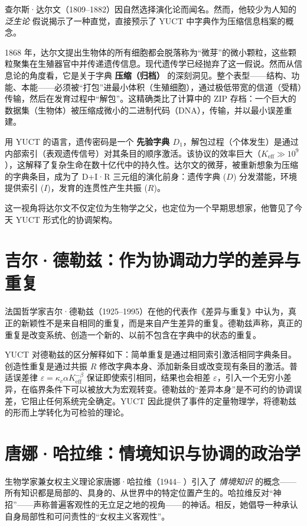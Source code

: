 \documentclass[12pt,a4paper]{article}
\begin{document}
	查尔斯·达尔文（1809–1882）因自然选择演化论而闻名。然而，他较少为人知的 \emph{泛生论} 假说揭示了一种直觉，直接预示了 YUCT 中字典作为压缩信息档案的概念。
	
	1868 年，达尔文提出生物体的所有细胞都会脱落称为“微芽”的微小颗粒，这些颗粒聚集在生殖器官中并传递遗传信息。现代遗传学已经抛弃了这一假说。然而从信息论的角度看，它是关于字典 \textbf{压缩（归档）} 的深刻洞见。整个表型——结构、功能、本能——必须被“打包”进最小体积（生殖细胞），通过极低带宽的信道（受精）传输，然后在发育过程中“解包”。这精确类比了计算中的 ZIP 存档：一个巨大的数据集（生物体）被压缩成微小的二进制代码（DNA），传输，并以最小误差重建。
	
	用 YUCT 的语言，遗传密码是一个 \textbf{先验字典 \(D_1\)}，解包过程（个体发生）是通过内部索引（表观遗传信号）对其条目的顺序激活。该协议的效率巨大（\(K_{\mathrm{eff}} \gg 10^9\)），这解释了复杂生命在数十亿代中的持久性。达尔文的微芽，被重新想象为压缩的字典条目，成为了 D+I·R 三元组的演化前身：遗传字典 (\(D\)) 分发潜能，环境提供索引 (\(I\))，发育的连贯性产生共振 (\(R\))。
	
	这一视角将达尔文不仅定位为生物学之父，也定位为一个早期思想家，他瞥见了今天 YUCT 形式化的协调架构。
	
	\section{吉尔·德勒兹：作为协调动力学的差异与重复}
	
	法国哲学家吉尔·德勒兹（1925–1995）在他的代表作《差异与重复》中认为，真正的新颖性不是来自相同的重复，而是来自产生差异的重复。德勒兹声称，真正的重复是改变系统、创造一个新的、以前不包含在字典中的状态的重复。
	
	YUCT 对德勒兹的区分解释如下：简单重复是通过相同索引激活相同字典条目。创造性重复是通过共振 \(R\) 修改字典本身、添加新条目或改变现有条目的激活。普适误差律 \(\varepsilon = \kappa_c \alpha K_{\mathrm{eff}}^{-\beta}\) 保证即使索引相同，结果也会相差 \(\varepsilon\)，引入一个无穷小差异，在临界条件下可以被放大为宏观转变。德勒兹的“差异本身”是不可约的协调误差，它阻止任何系统完全确定。YUCT 因此提供了事件的定量物理学，将德勒兹的形而上学转化为可检验的理论。
	
	\section{唐娜·哈拉维：情境知识与协调的政治学}
	
	生物学家兼女权主义理论家唐娜·哈拉维（1944– ）引入了 \emph{情境知识} 的概念——所有知识都是局部的、具身的、从世界中的特定位置产生的。哈拉维反对“神招”——声称普遍客观性的无立足之地的视角——的神话。相反，她倡导一种承认自身局部性和可问责性的“女权主义客观性”。
	
\end{document}

